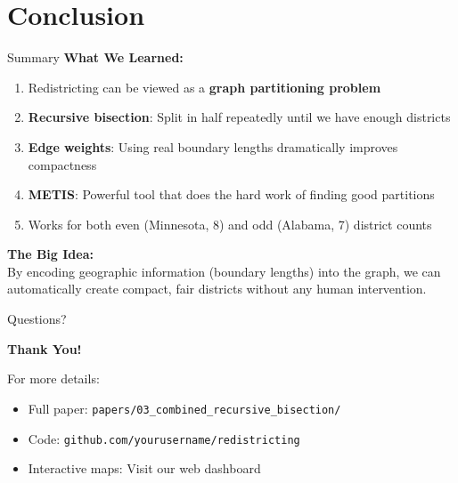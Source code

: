 \documentclass[aspectratio=169]{beamer}
\begin{document}
\section{Conclusion}

\begin{frame}{Summary}
\textbf{What We Learned:}
\begin{enumerate}
\item Redistricting can be viewed as a \textbf{graph partitioning problem}
\item \textbf{Recursive bisection}: Split in half repeatedly until we have enough districts
\item \textbf{Edge weights}: Using real boundary lengths dramatically improves compactness
\item \textbf{METIS}: Powerful tool that does the hard work of finding good partitions
\item Works for both even (Minnesota, 8) and odd (Alabama, 7) district counts
\end{enumerate}

\vspace{1em}
\textbf{The Big Idea:}\\
By encoding geographic information (boundary lengths) into the graph, we can automatically create compact, fair districts without any human intervention.
\end{frame}

\begin{frame}{Questions?}
\begin{center}
\Large{\textbf{Thank You!}}

\vspace{2em}
For more details:
\begin{itemize}
\item Full paper: \texttt{papers/03\_combined\_recursive\_bisection/}
\item Code: \texttt{github.com/yourusername/redistricting}
\item Interactive maps: Visit our web dashboard
\end{itemize}
\end{center}
\end{frame}
\end{document}
